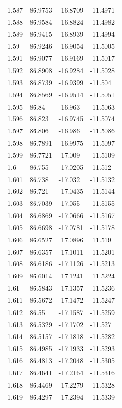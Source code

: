 \begin{tabular}{llll}
1.587 & 86.9753 & -16.8709 & -11.4971 \\
1.588 & 86.9584 & -16.8824 & -11.4982 \\
1.589 & 86.9415 & -16.8939 & -11.4994 \\
1.59 & 86.9246 & -16.9054 & -11.5005 \\
1.591 & 86.9077 & -16.9169 & -11.5017 \\
1.592 & 86.8908 & -16.9284 & -11.5028 \\
1.593 & 86.8739 & -16.9399 & -11.504 \\
1.594 & 86.8569 & -16.9514 & -11.5051 \\
1.595 & 86.84 & -16.963 & -11.5063 \\
1.596 & 86.823 & -16.9745 & -11.5074 \\
1.597 & 86.806 & -16.986 & -11.5086 \\
1.598 & 86.7891 & -16.9975 & -11.5097 \\
1.599 & 86.7721 & -17.009 & -11.5109 \\
1.6 & 86.755 & -17.0205 & -11.512 \\
1.601 & 86.738 & -17.032 & -11.5132 \\
1.602 & 86.721 & -17.0435 & -11.5144 \\
1.603 & 86.7039 & -17.055 & -11.5155 \\
1.604 & 86.6869 & -17.0666 & -11.5167 \\
1.605 & 86.6698 & -17.0781 & -11.5178 \\
1.606 & 86.6527 & -17.0896 & -11.519 \\
1.607 & 86.6357 & -17.1011 & -11.5201 \\
1.608 & 86.6186 & -17.1126 & -11.5213 \\
1.609 & 86.6014 & -17.1241 & -11.5224 \\
1.61 & 86.5843 & -17.1357 & -11.5236 \\
1.611 & 86.5672 & -17.1472 & -11.5247 \\
1.612 & 86.55 & -17.1587 & -11.5259 \\
1.613 & 86.5329 & -17.1702 & -11.527 \\
1.614 & 86.5157 & -17.1818 & -11.5282 \\
1.615 & 86.4985 & -17.1933 & -11.5293 \\
1.616 & 86.4813 & -17.2048 & -11.5305 \\
1.617 & 86.4641 & -17.2164 & -11.5316 \\
1.618 & 86.4469 & -17.2279 & -11.5328 \\
1.619 & 86.4297 & -17.2394 & -11.5339 \\

\end{tabular}
